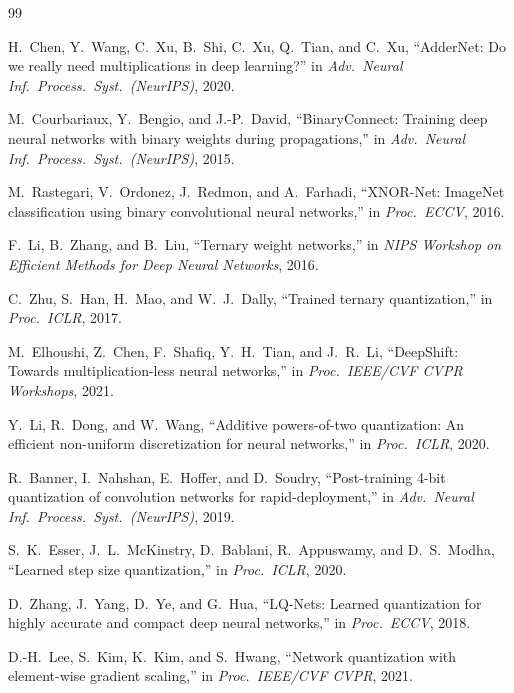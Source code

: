 \documentclass[12pt]{article}
\begin{document}
\begin{thebibliography}{99}

H.\ Chen, Y.\ Wang, C.\ Xu, B.\ Shi, C.\ Xu, Q.\ Tian, and C.\ Xu,
``AdderNet: Do we really need multiplications in deep learning?''
in \textit{Adv.\ Neural Inf.\ Process.\ Syst.\ (NeurIPS)}, 2020.

M.\ Courbariaux, Y.\ Bengio, and J.-P.\ David,
``BinaryConnect: Training deep neural networks with binary weights during propagations,''
in \textit{Adv.\ Neural Inf.\ Process.\ Syst.\ (NeurIPS)}, 2015.

M.\ Rastegari, V.\ Ordonez, J.\ Redmon, and A.\ Farhadi,
``XNOR-Net: ImageNet classification using binary convolutional neural networks,''
in \textit{Proc.\ ECCV}, 2016.

F.\ Li, B.\ Zhang, and B.\ Liu,
``Ternary weight networks,''
in \textit{NIPS Workshop on Efficient Methods for Deep Neural Networks}, 2016.

C.\ Zhu, S.\ Han, H.\ Mao, and W.\ J.\ Dally,
``Trained ternary quantization,''
in \textit{Proc.\ ICLR}, 2017.

M.\ Elhoushi, Z.\ Chen, F.\ Shafiq, Y.\ H.\ Tian, and J.\ R.\ Li,
``DeepShift: Towards multiplication-less neural networks,''
in \textit{Proc.\ IEEE/CVF CVPR Workshops}, 2021.

Y.\ Li, R.\ Dong, and W.\ Wang,
``Additive powers-of-two quantization: An efficient non-uniform discretization for neural networks,''
in \textit{Proc.\ ICLR}, 2020.

R.\ Banner, I.\ Nahshan, E.\ Hoffer, and D.\ Soudry,
``Post-training 4-bit quantization of convolution networks for rapid-deployment,''
in \textit{Adv.\ Neural Inf.\ Process.\ Syst.\ (NeurIPS)}, 2019.

S.\ K.\ Esser, J.\ L.\ McKinstry, D.\ Bablani, R.\ Appuswamy, and D.\ S.\ Modha,
``Learned step size quantization,''
in \textit{Proc.\ ICLR}, 2020.

D.\ Zhang, J.\ Yang, D.\ Ye, and G.\ Hua,
``LQ-Nets: Learned quantization for highly accurate and compact deep neural networks,''
in \textit{Proc.\ ECCV}, 2018.

D.-H.\ Lee, S.\ Kim, K.\ Kim, and S.\ Hwang,
``Network quantization with element-wise gradient scaling,''
in \textit{Proc.\ IEEE/CVF CVPR}, 2021.


\end{thebibliography}
\end{document}
